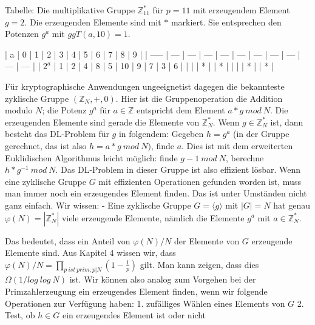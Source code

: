 \documentclass[a4paper]{article}
\begin{document}
\begin{multicols}{3}
        Tabelle: Die multiplikative Gruppe $\mathbb{Z}^*_{11}$ für $p=11$ mit erzeugendem Element $g=2$. Die erzeugenden Elemente sind mit $*$ markiert. Sie entsprechen den Potenzen $g^a$ mit $ggT(a,10) = 1$.

        | a     | 0   | 1   | 2   | 3   | 4   | 5   | 6   | 7   | 8   | 9   |
        | ----- | --- | --- | --- | --- | --- | --- | --- | --- | --- | --- |
        | $2^a$ | 1   | 2   | 4   | 8   | 5   | 10  | 9   | 7   | 3   | 6   |
        |       |     | *   |     | *   |     |     |     | *   |     | *   |

        Für kryptographische Anwendungen ungeeignetist dagegen die bekannteste zyklische Gruppe $(\mathbb{Z}_N,+,0)$. Hier ist die Gruppenoperation die Addition modulo $N$; die Potenz $g^a$ für $a\in\mathbb{Z}$ entspricht dem Element $a*g\ mod\ N$. Die erzeugenden Elemente sind gerade die Elemente von $\mathbb{Z}^*_N$. Wenn $g\in\mathbb{Z}^*_N$ ist, dann besteht das DL-Problem für $g$ in folgendem: Gegeben $h=g^a$ (in der Gruppe gerechnet, das ist also $h=a*g\ mod\ N)$, finde $a$. Dies ist mit dem erweiterten Euklidischen Algorithmus leicht möglich: finde $g-1\ mod\ N$, berechne $h*g^{-1}\ mod\ N$. Das DL-Problem in dieser Gruppe ist also effizient lösbar.
        Wenn eine zyklische Gruppe $G$ mit effizienten Operationen gefunden worden ist, muss man immer noch ein erzeugendes Element finden. Das ist unter Umständen nicht ganz einfach. Wir wissen:
        - Eine zyklische Gruppe $G=\langle g\rangle $ mit $|G|=N$ hat genau $\varphi(N) = |\mathbb{Z}^*_N|$ viele erzeugende Elemente, nämlich die Elemente $g^a$ mit $a\in\mathbb{Z}^*_N$.

        Das bedeutet, dass ein Anteil von $\varphi(N)/N$ der Elemente von $G$ erzeugende Elemente sind. Aus Kapitel 4 wissen wir, dass $\varphi(N)/N=\prod_{p\ ist\ prim, p|N}(1-\frac{1}{p})$ gilt. Man kann zeigen, dass dies $\Omega(1/log\ log\ N)$ ist. Wir können also analog zum Vorgehen bei der Primzahlerzeugung ein erzeugendes Element finden, wenn wir folgende Operationen zur Verfügung haben:
        1. zufälliges Wählen eines Elements von $G$
        2. Test, ob $h\in G$ ein erzeugendes Element ist oder nicht


\end{multicols}
\end{document}
